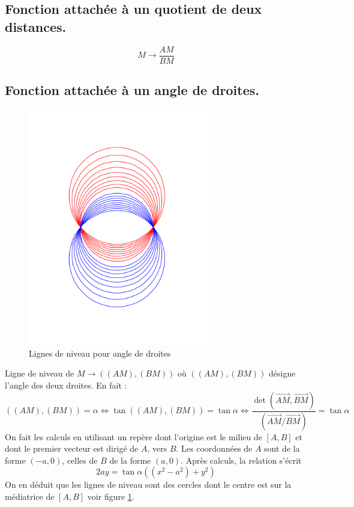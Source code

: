 \subsection{Fonction attachée à un quotient de deux distances.}
\begin{displaymath}
 M \rightarrow \frac{AM}{BM}
\end{displaymath}

\subsection{Fonction attachée à un angle de droites.}
\begin{figure}[ht]
 \centering
 \includegraphics[width=8cm]{C2005_1.pdf}
 \caption{Lignes de niveau pour angle de droites}
\label{fig:C2005_1}
\end{figure}
Ligne de niveau de $ M \rightarrow ((AM),(BM))$ où $((AM),(BM))$ désigne l'angle des deux droites.\newline
En fait :
\begin{displaymath}
 ((AM),(BM)) = \alpha \Leftrightarrow \tan ((AM),(BM))= \tan \alpha
\Leftrightarrow
\dfrac{\det(\overrightarrow{AM},\overrightarrow{BM})}{(\overrightarrow{AM}/\overrightarrow{BM})}
=\tan \alpha
\end{displaymath}
On fait les calculs en utilisant un repère dont l'origine est le milieu de $[A,B]$ et dont le premier vecteur est dirigé de $A$, vers $B$. Les coordonnées de $A$ sont de la forme $(-a,0)$, celles de $B$ de la forme $(a,0)$. Après calculs, la relation s'écrit
\begin{displaymath}
 2ay = \tan\alpha((x^2-a^2)+y^2)
\end{displaymath}
On en déduit que les lignes de niveau sont des cercles dont le centre est sur la médiatrice de $[A,B]$ voir figure \ref{fig:C2005_1}.
